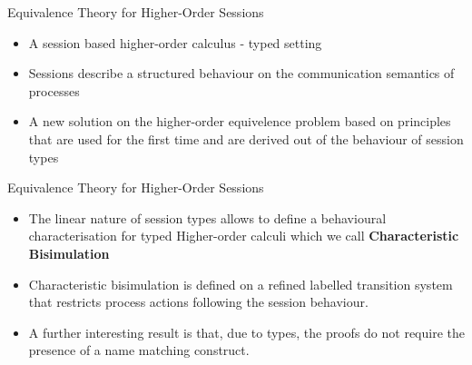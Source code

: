\documentclass{beamer}
\begin{document}
	\begin{frame}{Equivalence Theory for Higher-Order Sessions}
		\begin{itemize}
			\item	A session based higher-order calculus - typed setting

			\item	Sessions describe a structured behaviour on the communication semantics of processes

			\item	A new solution on the higher-order equivelence problem based
				on principles that are
				used for the first time and are derived out of the behaviour of session types
		\end{itemize}
	\end{frame}


	\begin{frame}{Equivalence Theory for Higher-Order Sessions}
		\begin{itemize}
			\item	The linear nature of session types allows to define
				a behavioural characterisation for typed Higher-order calculi
				which we call {\bf Characteristic Bisimulation}

			\item	Characteristic bisimulation is defined on a refined labelled transition system
				that restricts process actions following the session behaviour.

			\item	A further interesting result is that, due to types, the proofs do
				not require the presence of a name matching construct.
		\end{itemize}
	\end{frame}
\end{document}
